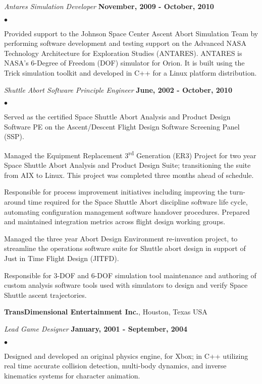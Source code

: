 \documentclass[margin,line]{res}
\newenvironment{list2}{%
  \begin{list}{$\bullet$}{%
      \setlength{\itemsep}{0in}
      \setlength{\parsep}{0in} \setlength{\parskip}{0in}
      \setlength{\topsep}{0in} \setlength{\partopsep}{0in} 
  \setlength{\leftmargin}{0.2in}}}{\end{list}}
\newcommand{\organization}[2] {{\bf #1}, #2\par}
\newcommand{\role}[2]{\vspace{-1em}\emph{#1} \hfill \textbf{#2}}
\begin{document}
\begin{resume}
\role{Antares Simulation Developer}{November, 2009 - October, 2010}
\begin{list2}
\item Provided support to the Johnson Space Center Ascent Abort Simulation Team by performing software development and testing support on the Advanced NASA Technology Architecture for Exploration Studies (ANTARES).  ANTARES is NASA's 6-Degree of Freedom (DOF) simulator for Orion.  It is built using the Trick simulation toolkit and developed in C++ for a Linux platform distribution.
\end{list2}
\role{Shuttle Abort Software Principle Engineer}{\bf June, 2002 - October, 2010}
\begin{list2}
\item Served as the certified Space Shuttle Abort Analysis and Product Design Software PE on the Ascent/Descent Flight Design Software Screening Panel (SSP).
\item Managed the Equipment Replacement 3\textsuperscript{rd} Generation (ER3) Project for two year Space Shuttle Abort Analysis and Product Design Suite; transitioning the  suite from AIX to Linux.   This project was completed three months ahead of schedule.
\item Responsible for process improvement initiatives including improving the turn-around time required for the Space Shuttle Abort discipline software life cycle, automating configuration management software handover procedures. Prepared and maintained integration metrics across flight design working groups.
\item Managed the three year Abort Design Environment re-invention project,  to streamline the operations software suite for Shuttle abort design in support of Just in Time Flight Design (JITFD).
\item Responsible for 3-DOF and 6-DOF simulation tool maintenance and authoring of custom analysis software tools used with simulators to design and verify Space Shuttle ascent trajectories.
\end{list2}

\organization{TransDimensional Entertainment Inc.}{Houston, Texas USA}

\role{Lead Game Designer}{January, 2001 - September, 2004}
\begin{list2}
\item Designed and developed an original physics engine, for Xbox; in C++ utilizing real time accurate collision detection, multi-body dynamics, and inverse kinematics systems for character animation.
\end{list2}



\end{resume}
\end{document}
